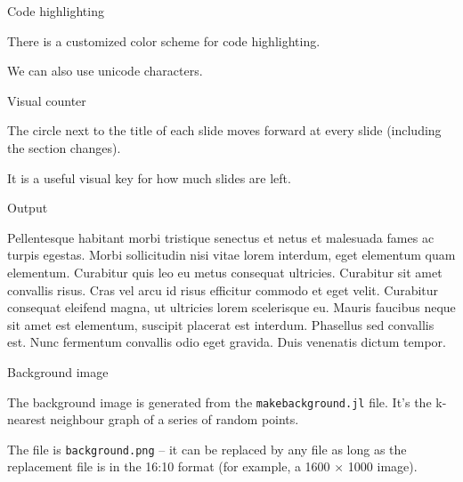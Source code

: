 \documentclass[12pt, compress, aspectratio=1610]{beamer}
\newenvironment{Shaded}{\begin{mdframed}}{\end{mdframed}}
\newcommand{\KeywordTok}[1]{\textcolor[rgb]{0.26,0.66,0.93}{\textbf{{#1}}}}
\newcommand{\FloatTok}[1]{\textcolor[HTML]{558B2F}{{#1}}}
\newcommand{\CharTok}[1]{\textcolor[HTML]{7E57C2}{{#1}}}
\newcommand{\StringTok}[1]{\textcolor[HTML]{7E57C2}{{#1}}}
\newcommand{\CommentTok}[1]{\textcolor[HTML]{546E7A}{\textit{{#1}}}}
\newcommand{\NormalTok}[1]{\textcolor[HTML]{212121}{{#1}}}
\let\OldTexttt\texttt
\renewcommand{\texttt}[1]{\OldTexttt{\color{codecolor}#1}}
\begin{document}
\begin{frame}[fragile]{Code highlighting}

There is a customized color scheme for code highlighting.

\begin{Shaded}
\end{Shaded}

We can also use \alert{unicode characters}.

\end{frame}

\begin{frame}{Visual counter}

The circle next to the title of each slide moves forward at every slide
(including the section changes).

It is a useful visual key for how much slides are left.

\end{frame}

\begin{frame}{Output}

Pellentesque habitant morbi tristique senectus et netus et malesuada
fames ac turpis egestas. Morbi sollicitudin nisi vitae lorem interdum,
eget elementum quam elementum. Curabitur quis leo eu metus consequat
ultricies. Curabitur sit amet convallis risus. Cras vel arcu id risus
efficitur commodo et eget velit. Curabitur consequat eleifend magna, ut
ultricies lorem scelerisque eu. Mauris faucibus neque sit amet est
elementum, suscipit placerat est interdum. Phasellus sed convallis est.
Nunc fermentum convallis odio eget gravida. Duis venenatis dictum
tempor.

\end{frame}

\begin{frame}[fragile]{Background image}

The background image is generated from the \texttt{makebackground.jl}
file. It's the k-nearest neighbour graph of a series of random points.

The file is \texttt{background.png} -- it can be replaced by any file
\alert{as long
as} the replacement file is in the 16:10 format (for example, a 1600
\(\times\) 1000 image).

\end{frame}
\end{document}

